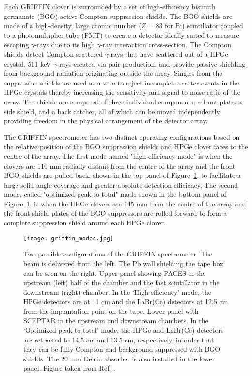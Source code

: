 \documentclass[cnatzke_thesis_proposal.tex]{subfiles}
\begin{document}
Each GRIFFIN clover is surrounded by a set of high-efficiency bismuth germanate (BGO) active Compton suppression shields.
The BGO shields are made of a high-density, large atomic number ($Z$ = 83 for Bi) scintillator coupled to a photomultiplier tube (PMT) to create a detector ideally suited to measure escaping $\gamma$-rays due to its high $\gamma$-ray interaction cross-section. 
The Compton shields detect Compton-scattered $\gamma$-rays that have scattered out of a HPGe crystal, 511 keV $\gamma$-rays created via pair production, and provide passive shielding from background radiation originating outside the array. 
Singles from the suppression shields are used as a veto to reject incomplete scatter events in the HPGe crystals thereby increasing the sensitivity and signal-to-noise ratio of the array. 
The shields are composed of three individual components; a front plate, a side shield, and a back catcher, all of which can be moved independently providing freedom in the physical arrangement of the detector array. 

The GRIFFIN spectrometer has two distinct operating configurations based on the relative position of the BGO suppression shields and HPGe clover faces to the centre of the array. 
The first mode named "high-efficiency mode" is when the clovers are 110 mm radially distant from the centre of the array and the front BGO shields are pulled back, shown in the top panel of Figure~\ref{fig:griffin_modes}, to facilitate a large solid angle coverage and greater absolute detection efficiency. 
The second mode, called "optimized peak-to-total" mode shown in the bottom panel of Figure~\ref{fig:griffin_modes}, is when the HPGe clovers are 145 mm from the centre of the array and the front shield plates of the BGO suppressors are rolled forward to form a complete suppression shield around each HPGe clover. 

\begin{center}
  \begin{figure}[H]
    \begin{center}
      \texttt{[image: griffin\_modes.jpg]}
    \end{center}
    \caption{Two possible configurations of the GRIFFIN spectrometer. The beam is delivered from the left. The Pb wall shielding the tape box can be seen on the right. Upper panel showing PACES in the upstream (left) half of the chamber and the fast scintillator in the downstream (right) chamber. In the ‘High-efficiency’ mode, the HPGe detectors are at 11 cm and the LaBr(Ce) detectors at 12.5 cm from the implantation point on the tape. Lower panel with SCEPTAR in the upstream and downstream chambers. In the ‘Optimized peak-to-total’ mode, the HPGe and LaBr(Ce) detectors are retracted to 14.5 cm and 13.5 cm, respectively, in order that they can be fully Compton and background suppressed with BGO shields. The 20 mm Delrin absorber is also installed in the lower panel. Figure taken from Ref. \cite{garnsworthy_griffin_2019}.}
    \label{fig:griffin_modes}
  \end{figure}
\end{center}
\end{document}
